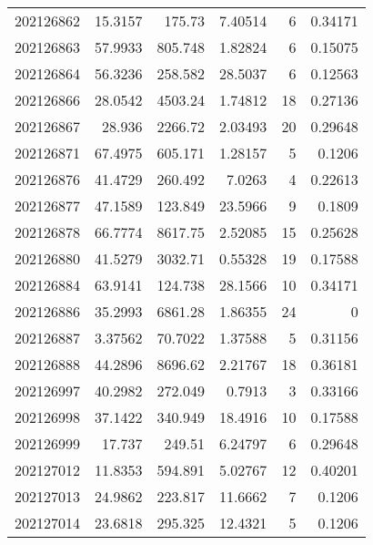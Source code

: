 \begin{tabular}{rrrrrr}
 202126862 &         15.3157  &      175.73   &            7.40514 &           6 & 0.34171 \\
 202126863 &         57.9933  &      805.748  &            1.82824 &           6 & 0.15075 \\
 202126864 &         56.3236  &      258.582  &           28.5037  &           6 & 0.12563 \\
 202126866 &         28.0542  &     4503.24   &            1.74812 &          18 & 0.27136 \\
 202126867 &         28.936   &     2266.72   &            2.03493 &          20 & 0.29648 \\
 202126871 &         67.4975  &      605.171  &            1.28157 &           5 & 0.1206  \\
 202126876 &         41.4729  &      260.492  &            7.0263  &           4 & 0.22613 \\
 202126877 &         47.1589  &      123.849  &           23.5966  &           9 & 0.1809  \\
 202126878 &         66.7774  &     8617.75   &            2.52085 &          15 & 0.25628 \\
 202126880 &         41.5279  &     3032.71   &            0.55328 &          19 & 0.17588 \\
 202126884 &         63.9141  &      124.738  &           28.1566  &          10 & 0.34171 \\
 202126886 &         35.2993  &     6861.28   &            1.86355 &          24 & 0       \\
 202126887 &          3.37562 &       70.7022 &            1.37588 &           5 & 0.31156 \\
 202126888 &         44.2896  &     8696.62   &            2.21767 &          18 & 0.36181 \\
 202126997 &         40.2982  &      272.049  &            0.7913  &           3 & 0.33166 \\
 202126998 &         37.1422  &      340.949  &           18.4916  &          10 & 0.17588 \\
 202126999 &         17.737   &      249.51   &            6.24797 &           6 & 0.29648 \\
 202127012 &         11.8353  &      594.891  &            5.02767 &          12 & 0.40201 \\
 202127013 &         24.9862  &      223.817  &           11.6662  &           7 & 0.1206  \\
 202127014 &         23.6818  &      295.325  &           12.4321  &           5 & 0.1206  \\

\end{tabular}
